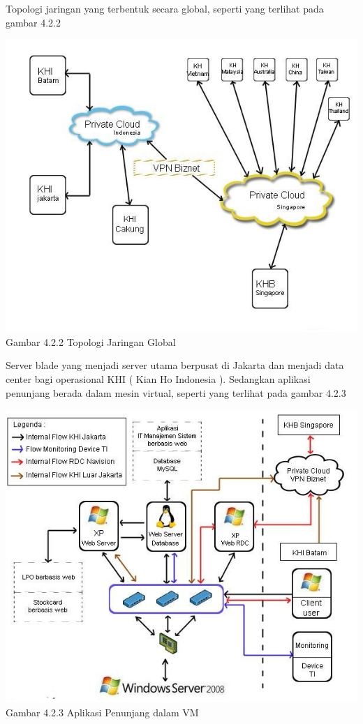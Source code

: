 Topologi jaringan yang terbentuk secara global, seperti yang terlihat pada gambar 4.2.2
\begin{center}
\includegraphics[scale=0.71]{gambar422.jpg} \\
Gambar 4.2.2 Topologi Jaringan Global
\end{center}
Server blade yang menjadi server utama berpusat di Jakarta dan menjadi data center bagi operasional KHI ( Kian Ho Indonesia ). Sedangkan aplikasi penunjang berada dalam mesin virtual, seperti yang terlihat pada gambar 4.2.3
\begin{center}
\includegraphics[scale=0.71]{gambar423.jpg} \\
Gambar 4.2.3 Aplikasi Penunjang dalam VM
\end{center}
